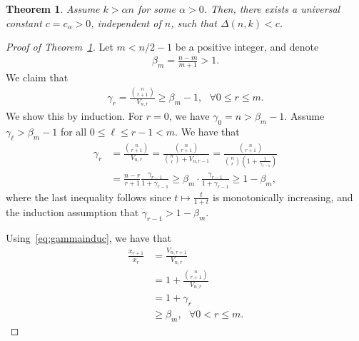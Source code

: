 \documentclass[10pt,a4paper]{amsart}
\newtheorem{thm}{Theorem}
\begin{document}
\begin{thm}
Assume $k>\alpha n$ for some $\alpha>0$. Then, there exists a universal constant $c=c_{
\alpha}>0$, independent of $n$, such that $\Delta(n,k)<c$.    
\label{thm:DcConstantGap}
\end{thm}

\begin{proof}[Proof of Theorem~\ref{thm:DcConstantGap}]
Let $m<n/2-1$ be a positive integer, and denote
\begin{align}
\beta_m=\frac{n-m}{m+1}>1.    
\end{align}
We claim that 
\begin{align}
\gamma_r=\frac{{{n}\choose{r+1}}}{V_{n,r}}\geq \beta_m-1,~~~ \forall 0\leq r\leq m.   
\label{eq:gammainduc}
\end{align}
We show this by induction. For $r=0$, we have $\gamma_0=n>\beta_m-1$. Assume $\gamma_\ell>\beta_m-1$ for all $0\leq \ell\leq r-1<m$. We have that
\begin{align}
\gamma_{r}&=\frac{{{n}\choose{r+1}}}{V_{n,r}}=\frac{{{n}\choose{r+1}}}{{{n}\choose{r}}+V_{n,r-1}}=\frac{{{n}\choose{r+1}}}{{{n}\choose{r}}\left(1+\frac{1}{\gamma_{r-1}}\right)}\nonumber\\
&=\frac{n-r}{r+1}\frac{\gamma_{r-1}}{1+\gamma_{r-1}}\geq \beta_m\cdot \frac{\gamma_{r-1}}{1+\gamma_{r-1}}\geq 1-\beta_m,   
\end{align}
where the last inequality follows since $t\mapsto\frac{t}{1+t}$ is monotonically increasing, and the induction assumption that $\gamma_{r-1}>1-\beta_m$. 

Using~\eqref{eq:gammainduc}, we have that
\begin{align}
\frac{x_{r+1}}{x_r}&=\frac{V_{n,r+1}}{V_{n,r}}\\
&=1+\frac{{{n}\choose{r+1}}}{V_{n,r}}\\
&=1+\gamma_r\\
&\geq \beta_m,~~~  \forall 0<r\leq m.
\label{eq:xrratiobound}
\end{align}


\end{proof}
\end{document}
